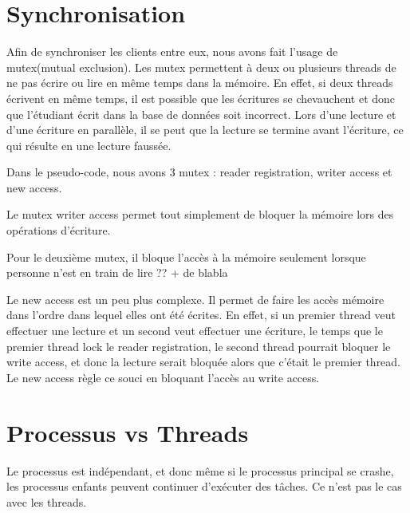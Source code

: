 \documentclass[utf8]{article}
\begin{document}
\begin{large}
\section{Synchronisation}
\par
\indent

Afin de synchroniser les clients entre eux, nous avons fait l'usage de
mutex(mutual exclusion). Les mutex permettent à deux ou plusieurs threads de ne
pas écrire ou lire en même temps dans la mémoire. En effet, si deux threads
écrivent en même temps, il est possible que les écritures se chevauchent et donc
que l'étudiant écrit dans la base de données soit incorrect. Lors d'une lecture
et d'une écriture en parallèle, il se peut que la lecture se termine avant
l'écriture, ce qui résulte en une lecture faussée.
\par
Dans le pseudo-code, nous avons 3 mutex : reader registration, writer access et
new access. 
\par
Le mutex writer access permet tout simplement de bloquer la mémoire
lors des opérations d'écriture. 
\par
Pour le deuxième mutex, il bloque l'accès à la mémoire seulement lorsque
personne n'est en train de lire ?? + de blabla
\par
Le new access
est un peu plus complexe. Il permet de faire les accès mémoire dans l'ordre dans
lequel elles ont été écrites. En effet, si un premier thread veut effectuer une
lecture et un second veut effectuer une écriture, le temps que le premier thread
lock le reader registration, le second thread pourrait bloquer le write access, et
donc la lecture serait bloquée alors que c'était le premier thread. Le new
access règle ce souci en bloquant l'accès au write access.
\par
\section{Processus vs Threads}
\par
\indent

Le processus est indépendant, et donc même si le processus principal se crashe,
les processus enfants peuvent continuer d'exécuter des tâches. Ce n'est pas le
cas avec les threads.


\end{large}
\end{document}
